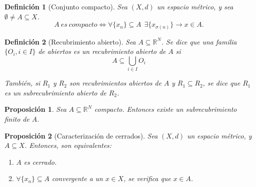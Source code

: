 \documentclass[11pt, a4paper, titlepage]{article}
\theoremstyle{theorem-style}
\newtheorem*{nprop}{Proposición}
\theoremstyle{definition-style}
\newtheorem*{ndef}{Definición}
\theoremstyle{remark-style}
\theoremstyle{example-style}
\newenvironment{nlist}
{\begin{enumerate}
\renewcommand\labelenumi{(\emph{\roman{enumi})}}}
{\end{enumerate}}
\begin{document}
\begin{ndef}[Conjunto compacto]
Sea $(X,d)$ un espacio métrico, y sea $\emptyset \ne A \subseteq X$. $$A\ es\ compacto \iff \forall \{x_n\} \subseteq A\ \ \exists \{x_{\sigma(n)}\} \rightarrow x\in A.$$
\end{ndef}

\begin{ndef}[Recubrimiento abierto]
	Sea $A \subseteq \mathbb{R}^N$. Se dice que una familia $\{O_i, i\in I\}$ de abiertos es un \emph{recubrimiento abierto} de $A$ si
	\[
		A \subseteq \bigcup_{i\in I} O_i
	\]
	
	También, si $R_1$ y $R_2$ son recubrimientos abiertos de $A$ y $R_1 \subseteq R_2$, se dice que $R_1$ es un \emph{subrecubrimiento abierto} de $R_2$.
\end{ndef}

\begin{nprop}
	Sea $A \subseteq \mathbb{R}^N$ compacto. Entonces existe un subrecubrimiento finito de $A$.
\end{nprop}

\begin{nprop}[Caracterización de cerrados]
Sea $(X,d)$ un espacio métrico, y $A\subseteq X$. Entonces, son equivalentes:

\begin{nlist}
\item $A$ es cerrado.
\item $\forall \{x_n\} \subseteq A$ convergente a un $x \in X$, se verifica que $x\in A$.
\end{nlist}

\end{nprop}
\end{document}

